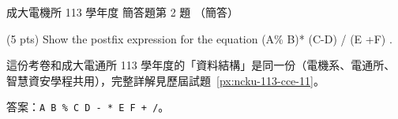 \begin{pastexam}[label={px:ncku-113-ee-11}]{成大電機所 113 學年度 簡答題第 2 題}
（簡答）

(5 pts) Show the postfix expression for the equation (A\% B)* (C-D) / (E +F) .
\end{pastexam}

\begin{pastsoln}
這份考卷和成大電通所 113 學年度的「資料結構」是同一份（電機系、電通所、智慧資安學程共用），完整詳解見歷屆試題~\ref{px:ncku-113-cce-11}。

答案：\texttt{A B \% C D - * E F + /}。
\end{pastsoln}
